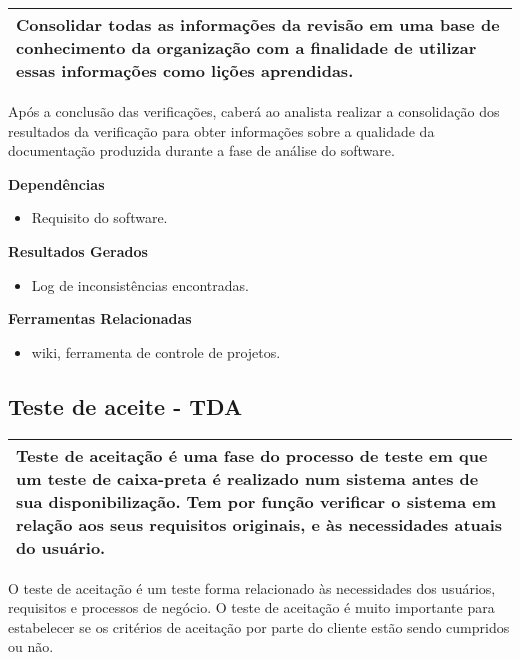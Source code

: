 \begin{table}[!ht]
\centering
\begin{tabular}{|p{130mm}|}
\hline
Consolidar todas as informações da revisão em uma base de conhecimento da organização com a finalidade de utilizar essas informações como lições aprendidas. \\
\hline
\end{tabular}
\end{table}

Após a conclusão das verificações, caberá ao analista realizar a consolidação dos resultados da verificação para obter informações sobre a qualidade da documentação produzida durante a fase de análise do software.

\textbf{Dependências}
\begin{itemize}
    \item Requisito do software.
\end{itemize}

\textbf{Resultados Gerados}
\begin{itemize}
    \item Log de inconsistências encontradas.
\end{itemize}

\textbf{Ferramentas Relacionadas}
\begin{itemize}
    \item  wiki, ferramenta de controle de projetos.
\end{itemize}

\subsection{Teste de aceite - TDA}
\label{sec:tda}

\begin{table}[!ht]
\centering
\begin{tabular}{|p{130mm}|}
\hline
Teste de aceitação é uma fase do processo de teste em que um teste de caixa-preta é realizado num sistema antes de sua disponibilização. Tem por função verificar o sistema em relação aos seus requisitos originais, e às necessidades atuais do usuário. \\ 
\hline
\end{tabular}
\end{table}

O teste de aceitação é um teste forma relacionado às necessidades dos usuários, requisitos e processos de negócio. O teste de aceitação é muito importante para estabelecer se os critérios de aceitação por parte do cliente estão sendo cumpridos ou não.

